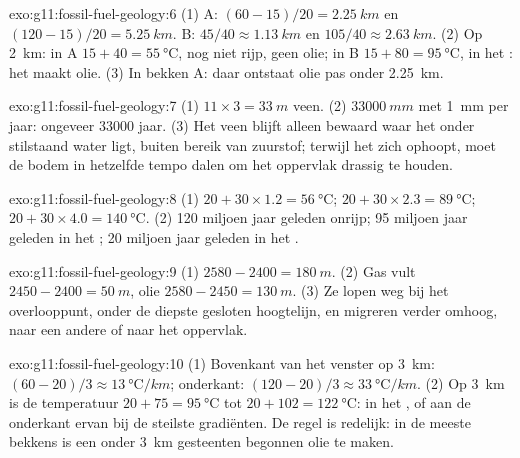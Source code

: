 \begin{solution}{exo:g11:fossil-fuel-geology:6}
(1) A: $(60 - 15)/20 = \qty{2.25}{km}$ en $(120 - 15)/20 = \qty{5.25}{km}$.
B: $45/40 \approx \qty{1.13}{km}$ en $105/40 \approx \qty{2.63}{km}$.
(2) Op \qty{2}{km}: in A $15 + 40 = \qty{55}{\degreeCelsius}$, nog niet
rijp, geen olie; in B $15 + 80 = \qty{95}{\degreeCelsius}$, in het :
het maakt olie. (3) In bekken A: daar ontstaat olie pas onder
\qty{2.25}{km}.
\end{solution}

\begin{solution}{exo:g11:fossil-fuel-geology:7}
(1) $11 \times 3 = \qty{33}{m}$ veen. (2) $\qty{33000}{mm}$ met
\qty{1}{mm} per jaar: ongeveer \num{33000} jaar. (3) Het veen blijft alleen bewaard waar
het onder stilstaand water ligt, buiten bereik van zuurstof; terwijl het zich ophoopt,
moet de bodem in hetzelfde tempo dalen om het oppervlak drassig te houden.
\end{solution}

\begin{solution}{exo:g11:fossil-fuel-geology:8}
(1) $20 + 30 \times 1.2 = \qty{56}{\degreeCelsius}$;
$20 + 30 \times 2.3 = \qty{89}{\degreeCelsius}$;
$20 + 30 \times 4.0 = \qty{140}{\degreeCelsius}$.
(2) 120 miljoen jaar geleden onrijp; 95 miljoen jaar geleden in het
; 20 miljoen jaar geleden in het .
\end{solution}

\begin{solution}{exo:g11:fossil-fuel-geology:9}
(1) $2580 - 2400 = \qty{180}{m}$. (2) Gas vult
$2450 - 2400 = \qty{50}{m}$, olie $2580 - 2450 = \qty{130}{m}$. (3) Ze lopen
weg bij het overlooppunt, onder de diepste gesloten hoogtelijn, en migreren verder
omhoog, naar een andere  of naar het oppervlak.
\end{solution}

\begin{solution}{exo:g11:fossil-fuel-geology:10}
(1) Bovenkant van het venster op \qty{3}{km}: $(60 - 20)/3 \approx
\qty{13}{\degreeCelsius/km}$; onderkant: $(120 - 20)/3 \approx
\qty{33}{\degreeCelsius/km}$. (2) Op \qty{3}{km} is de temperatuur
$20 + 75 = \qty{95}{\degreeCelsius}$ tot $20 + 102 = \qty{122}{\degreeCelsius}$:
in het , of aan de onderkant ervan bij de steilste gradiënten. De regel is
redelijk: in de meeste bekkens is een  onder \qty{3}{km} gesteenten
begonnen olie te maken.
\end{solution}

